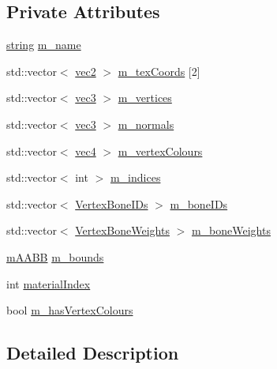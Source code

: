 \subsection*{Private Attributes}
\begin{DoxyCompactItemize}
\item 
\hyperlink{_types_8h_ad453f9f71ce1f9153fb748d6bb25e454}{string} \hyperlink{class_mesh_a6bcd1a563dee5297ad071a44f81dada0}{m\+\_\+name}
\item 
std\+::vector$<$ \hyperlink{_types_8h_a43182e59794291f6ab00e51b160706c2}{vec2} $>$ \hyperlink{class_mesh_aa53a65ca2e0c80a17c5f86620c572e8f}{m\+\_\+tex\+Coords} \mbox{[}2\mbox{]}
\item 
std\+::vector$<$ \hyperlink{_types_8h_a3d0ce73e3199de81565fb01632415288}{vec3} $>$ \hyperlink{class_mesh_acdb6a67de9921b11a4f091288c4a1504}{m\+\_\+vertices}
\item 
std\+::vector$<$ \hyperlink{_types_8h_a3d0ce73e3199de81565fb01632415288}{vec3} $>$ \hyperlink{class_mesh_af8247fe75ace9282a2910930fead2b5f}{m\+\_\+normals}
\item 
std\+::vector$<$ \hyperlink{_types_8h_ac54e849f8b2339f592307eaf6cdbba77}{vec4} $>$ \hyperlink{class_mesh_aec912675a7a52daf1d8096160384fbe8}{m\+\_\+vertex\+Colours}
\item 
std\+::vector$<$ int $>$ \hyperlink{class_mesh_ac2dfc2ca50bea355e2a5425cbb0a5aa8}{m\+\_\+indices}
\item 
std\+::vector$<$ \hyperlink{struct_vertex_bone_i_ds}{Vertex\+Bone\+I\+Ds} $>$ \hyperlink{class_mesh_a453ac697baeb3f4f1135e95650777df8}{m\+\_\+bone\+I\+Ds}
\item 
std\+::vector$<$ \hyperlink{struct_vertex_bone_weights}{Vertex\+Bone\+Weights} $>$ \hyperlink{class_mesh_af94a4a50f8aa0939d54a276db0a30405}{m\+\_\+bone\+Weights}
\item 
\hyperlink{structm_a_a_b_b}{m\+A\+A\+BB} \hyperlink{class_mesh_ab93e9864474600467951b5cf2e4bbe86}{m\+\_\+bounds}
\item 
int \hyperlink{class_mesh_a20c05451817a9fb9a67e07b1f2f88163}{material\+Index}
\item 
bool \hyperlink{class_mesh_a8ca68e64d0d562167d90cc2eb668d948}{m\+\_\+has\+Vertex\+Colours}
\end{DoxyCompactItemize}


\subsection{Detailed Description}


